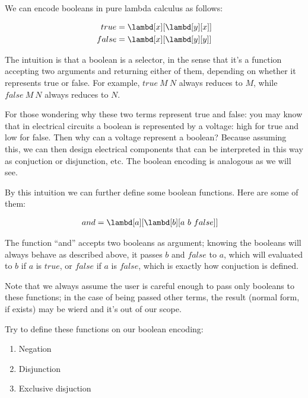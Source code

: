 \documentclass[../../../include/open-logic-section]{subfiles}
\begin{document}

We can encode booleans in pure lambda calculus as follows:

\begin{align*}
  {true} &= \lambd[x][\lambd[y][x]]\\
  {false} &= \lambd[x][\lambd[y][y]]
\end{align*}

The intuition is that a boolean is a selector, in the sense that it's a function accepting two arguments
and returning either of them, depending on whether it represents true or
false. For example, $true ~ M ~ N$ always reduces to $M$, while $false
~ M ~ N$ always reduces to $N$.

\begin{explain}
  For those wondering why these two terms represent true and false:
  you may know that in electrical circuits a boolean is represented by
  a voltage: high for true and low for false. Then why can a voltage
  represent a boolean? Because assuming this, we can then design
  electrical components that can be interpreted in this way as conjuction or
  disjunction, etc. The boolean encoding is analogous as we will see.
\end{explain}


By this intuition we can further define some boolean functions. Here
are some of them:

\begin{align*}
  {and} &= \lambd[a][\lambd[b][a ~ b ~ {false}]]
\end{align*}

The function ``and'' accepts two booleans as argument; knowing the
booleans will always behave as described above, it passes $b$ and ${false}$
to $a$, which will evaluated to $b$ if $a$ is ${true}$, or ${false}$ if $a$ is ${false}$,
which is exactly how conjuction is defined.

Note that we always assume the user is careful enough to pass only booleans to these functions; in the
case of being passed other terms, the result (normal form, if exists) may be wierd and it's
out of our scope.

\begin{prob}
  Try to define these functions on our boolean encoding:
  \begin{enumerate}
  \item Negation
  \item Disjunction
  \item Exclusive disjuction
  \end{enumerate}
\end{prob}
\end{document}

